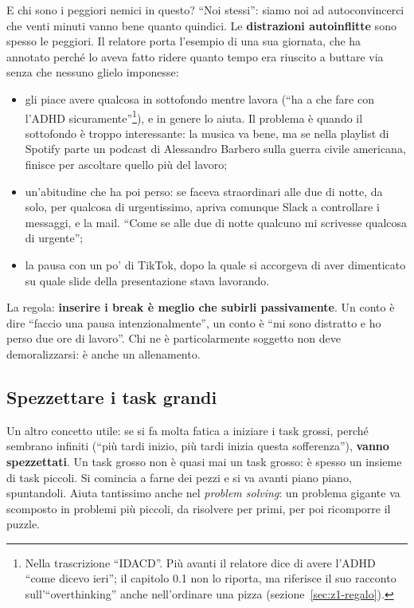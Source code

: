 E chi sono i peggiori nemici in questo? ``Noi stessi'': siamo noi ad
autoconvincerci che venti minuti vanno bene quanto quindici. Le
\textbf{distrazioni autoinflitte} sono spesso le peggiori. Il relatore porta
l'esempio di una sua giornata, che ha annotato perché lo aveva fatto ridere
quanto tempo era riuscito a buttare via senza che nessuno glielo imponesse:
\begin{itemize}
  \item gli piace avere qualcosa in sottofondo mentre lavora (``ha a che fare con
        l'ADHD sicuramente''\footnote{Nella trascrizione ``IDACD''. Più avanti il
        relatore dice di avere l'ADHD ``come dicevo ieri''; il capitolo 0.1 non
        lo riporta, ma riferisce il suo racconto sull'``overthinking'' anche
        nell'ordinare una pizza (sezione~\ref{sec:z1-regalo}).}),
        e in genere lo aiuta. Il problema è quando il sottofondo è troppo
        interessante: la musica va bene, ma se nella playlist di Spotify parte un
        podcast di Alessandro Barbero sulla guerra civile americana, finisce per
        ascoltare quello più del lavoro;
  \item un'abitudine che ha poi perso: se faceva straordinari alle due di notte,
        da solo, per qualcosa di urgentissimo, apriva comunque Slack a
        controllare i messaggi, e la mail. ``Come se alle due di notte qualcuno
        mi scrivesse qualcosa di urgente'';
  \item la pausa con un po' di TikTok, dopo la quale si accorgeva di aver
        dimenticato su quale slide della presentazione stava lavorando.
\end{itemize}
La regola: \textbf{inserire i break è meglio che subirli passivamente}. Un conto
è dire ``faccio una pausa intenzionalmente'', un conto è ``mi sono distratto e ho
perso due ore di lavoro''. Chi ne è particolarmente soggetto non deve
demoralizzarsi: è anche un allenamento.

\subsection{Spezzettare i task grandi}

Un altro concetto utile: se si fa molta fatica a iniziare i task grossi, perché
sembrano infiniti (``più tardi inizio, più tardi inizia questa sofferenza''),
\textbf{vanno spezzettati}. Un task grosso non è quasi mai un task grosso: è
spesso un insieme di task piccoli. Si comincia a farne dei pezzi e si va avanti
piano piano, spuntandoli. Aiuta tantissimo anche nel \emph{problem solving}: un
problema gigante va scomposto in problemi più piccoli, da risolvere per primi, per
poi ricomporre il puzzle.

